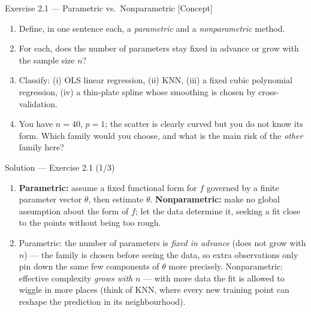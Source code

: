 \documentclass[aspectratio=169,11pt]{beamer}
\begin{document}
\begin{frame}{Exercise 2.1 --- Parametric vs.\ Nonparametric [Concept]}
\begin{exercise}
\begin{enumerate}
  \item Define, in one sentence each, a \emph{parametric} and a
        \emph{nonparametric} method.
  \item For each, does the number of parameters stay fixed in advance
        or grow with the sample size $n$?
  \item Classify: (i) OLS linear regression, (ii) KNN,
        (iii) a fixed cubic polynomial regression,
        (iv) a thin-plate spline whose smoothing is chosen by
        cross-validation.
  \item You have $n=40$, $p=1$; the scatter is clearly curved but you
        do not know its form. Which family would you choose, and what
        is the main risk of the \emph{other} family here?
\end{enumerate}
\end{exercise}
\end{frame}

\begin{frame}{Solution --- Exercise 2.1 (1/3)}
\begin{solutionbox}
\begin{enumerate}
  \item \textbf{Parametric:} assume a fixed functional form for $f$
        governed by a finite parameter vector $\theta$, then estimate
        $\theta$. \textbf{Nonparametric:} make no global assumption
        about the form of $f$; let the data determine it, seeking a
        fit close to the points without being too rough.
  \item Parametric: the number of parameters is \emph{fixed in
        advance} (does not grow with $n$) --- the family is chosen
        before seeing the data, so extra observations only pin down
        the same few components of $\theta$ more precisely.
        Nonparametric: effective complexity \emph{grows with} $n$ ---
        with more data the fit is allowed to wiggle in more places
        (think of KNN, where every new training point can reshape the
        prediction in its neighbourhood).
\end{enumerate}
\end{solutionbox}
\end{frame}
\end{document}
